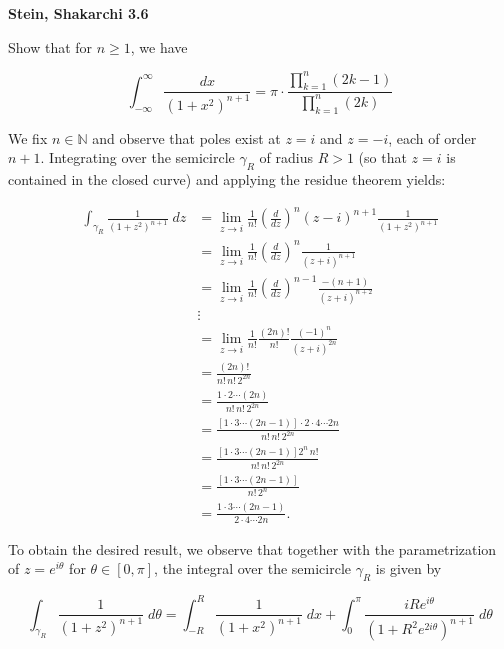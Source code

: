 \textbf{Stein, Shakarchi 3.6}

Show that for $n \ge 1$, we have

$$
  \int_{-\infty}^{\infty} {\frac{dx}{\left( 1 + x^2 \right)^{n+1}}} = \pi \cdot \frac{\prod\limits_{k=1}^{n} (2k - 1)}{\prod\limits_{k=1}^{n} (2k)}
$$

\begin{solution}
  We fix $n \in \mathbb{N}$ and observe that poles exist at $z = i$ and $z = -i$, each of order $n + 1$. Integrating 
  over the semicircle $\gamma_R$ of radius $R > 1$ (so that $z = i$ is contained in the closed curve) and applying the 
  residue theorem yields:

  \begin{align*}
    \int_{\gamma_R} { \frac{1}{(1 + z^2)^{n+1}} \; dz } 
      &= \lim\limits_{z \to i} \frac{1}{n!} \left(\frac{d}{dz}\right)^n (z - i)^{n+1} \frac{1}{(1 + z^2)^{n+1}} \\
      &= \lim\limits_{z \to i} \frac{1}{n!} \left(\frac{d}{dz}\right)^n \frac{1}{(z + i)^{n+1}} \\
      &= \lim\limits_{z \to i} \frac{1}{n!} \left(\frac{d}{dz}\right)^{n-1} \frac{-(n+1)}{(z + i)^{n+2}} \\
      &\vdots \\
      &= \lim\limits_{z \to i} \frac{1}{n!} \frac{(2n)!}{n!} \frac{(-1)^n}{(z + i)^{2n}} \\
      &= \frac{(2n)!}{n! \, n! \, 2^{2n}} \\
      &= \frac{1 \cdot 2 \cdots (2n)}{n! \, n! \, 2^{2n}} \\
      &= \frac{[1 \cdot 3 \cdots (2n - 1)] \cdot 2 \cdot 4 \cdots 2n}{n! \, n! \, 2^{2n}} \\
      &= \frac{[1 \cdot 3 \cdots (2n - 1)] 2^n \, n!}{n! \, n! \, 2^{2n}} \\
      &= \frac{[1 \cdot 3 \cdots (2n - 1)]}{n! \, 2^n} \\
      &= \frac{1 \cdot 3 \cdots (2n - 1)}{2 \cdot 4 \cdots 2n}.
  \end{align*}

  To obtain the desired result, we observe that together with the parametrization of 
  $z = e^{i \theta}$ for $\theta \in [0, \pi]$, the integral over the semicircle $\gamma_R$ is given by

  $$
    \int_{\gamma_R} { \frac{1}{(1 + z^2)^{n+1}} \; d\theta } = \int_{-R}^{R} { \frac{1}{(1 + x^2)^{n+1}} \; dx } 
                                                             + \int_0^{\pi} { \frac{i R e^{i \theta}}{\left(1 + R^2 e^{2 i \theta}\right)^{n+1}} \; d\theta }
  $$


\end{solution}
